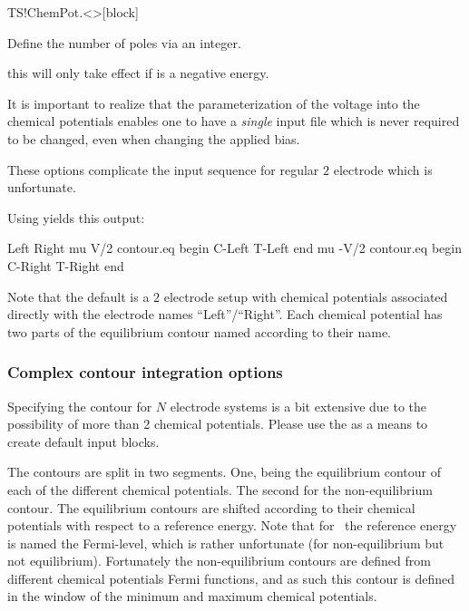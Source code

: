 \begin{fdfentry}{TS!ChemPot.<>}[block]
\begin{fdfoptions}

    Define the number of poles via an integer.
    
    \note this will only take effect if
     is a negative energy. 

  \end{fdfoptions}

  It is important to realize that the parameterization of the voltage
  into the chemical potentials enables one to have a \emph{single}
  input file which is never required to be changed, even when changing
  the applied bias.

\end{fdfentry}

These options complicate the input sequence for regular $2$ electrode
which is unfortunate. 

Using  yields this output:
\begin{fdfexample}
    Left
    Right
    mu V/2
    contour.eq
      begin
        C-Left
        T-Left
      end
    mu -V/2
    contour.eq
      begin
        C-Right
        T-Right
      end
\end{fdfexample}

Note that the default is a $2$ electrode setup with chemical
potentials associated directly with the electrode names
``Left''/``Right''. Each chemical potential has two parts of the
equilibrium contour named according to their name.



\subsubsection{Complex contour integration options}

Specifying the contour for $N$ electrode systems is a bit extensive
due to the possibility of more than 2 chemical potentials. Please use
the  as a means to create default input
blocks.

The contours are split in two segments. One, being the equilibrium
contour of each of the different chemical potentials. The second for
the non-equilibrium contour. The equilibrium contours are shifted
according to their chemical potentials with respect to a reference
energy. Note that for \tsiesta\ the reference energy is named the
Fermi-level, which is rather unfortunate (for non-equilibrium but not
equilibrium). Fortunately the non-equilibrium contours are defined
from different chemical potentials Fermi functions, and as such this
contour is defined in the window of the minimum and maximum chemical
potentials.

